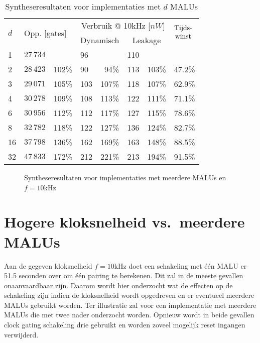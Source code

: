 \begin{table}[h]
	\caption{Syntheseresultaten voor implementaties met $d$ MALUs}
	\label{tabel-resultaten-md}

	\centering
	\begin{tabular}{llrlrlrl}
		\toprule
		\multirow{2}{*}{$d$} & \multicolumn{2}{l}{\multirow{2}{*}{Opp. [gates]}}	& \multicolumn{4}{c}{Verbruik @ 10kHz [$nW$]}	& \multirow{2}{*}{$\begin{array}{@{}c@{}}\text{Tijds-}\\\text{winst}\end{array}$}\\
		\cmidrule{4-7}
		&	& & \multicolumn{2}{c}{Dynamisch}	& \multicolumn{2}{c}{Leakage}	&\\
		\midrule
		1			& $27\,734$	& 			& 96	& 			& 110	& 			& \\
		2			& $28\,423$	& 102\%	& 90	& 94\%	& 113	& 103\%	& 47.2\%\\
		3			& $29\,071$	& 105\%	& 103	& 107\%	& 118	& 107\%	& 62.9\%\\
		4			& $30\,278$	& 109\%	& 108	& 113\%	& 122	& 111\%	& 71.1\%\\
		6			& $30\,956$	& 112\%	& 112	& 117\%	& 127	& 115\%	& 78.6\%\\
		8			& $32\,782$	& 118\%	& 122	& 127\%	& 136	& 124\%	& 82.7\%\\
		16			& $37\,798$	& 136\%	& 162	& 169\%	& 163	& 148\%	& 88.5\%\\
		32			& $47\,833$	& 172\%	& 212	& 221\%	& 213	& 194\%	& 91.5\%\\
		\hline		
	\end{tabular}
\end{table}

\begin{figure}[h]
	\centering
		\caption{Syntheseresultaten voor implementaties met meerdere MALUs en $f = 10$kHz\label{figuur-resultaten-md}}
\end{figure}

\section{Hogere kloksnelheid vs.\ meerdere MALUs}

Aan de gegeven kloksnelheid $f = 10$kHz doet een schakeling met \'e\'en MALU er 51.5 seconden over om \'e\'en pairing te berekenen. Dit zal  in de meeste gevallen onaanvaardbaar zijn. Daarom wordt hier onderzocht wat de effecten op de schakeling zijn indien de kloksnelheid wordt opgedreven en er eventueel meerdere MALUs gebruikt worden. Ter illustratie zal voor een implementatie met meerdere MALUs die met twee nader onderzocht worden. Opnieuw wordt in beide gevallen clock gating schakeling drie gebruikt en worden zoveel mogelijk reset ingangen verwijderd.


